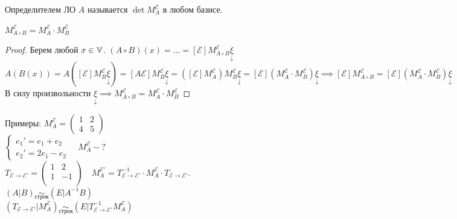 \documentclass[../main.tex]{subfiles}
\begin{document}
\begin{definition}
    Определителем ЛО $A$ называется $\det{M_{A}^{\mathcal{E}}}$ в любом базисе.
 \end{definition}

\begin{theorem}
    $M_{A\circ B }^{\mathcal{E}}=M_{A}^{\mathcal{E}}\cdot M_{B}^{\mathcal{E}}$
\end{theorem}
\begin{proof}
    Берем любой $x \in \mathbb{V}$. $(A\circ B )(x) = \dots = [\mathcal{E}]M_{A\circ B}^{\mathcal{E}}\underset{\downarrow}{\xi}$
    \\$A(B(x)) = A([\mathcal{E}]M_{B}^{\mathcal{E}}\underset{\downarrow}{\xi}) = [A\mathcal{E}]M_{B}^{\mathcal{E}}\underset{\downarrow}{\xi}= ([\mathcal{E}]M_{A}^{\mathcal{E}})M_{B}^{\mathcal{E}}\underset{\downarrow}{\xi}= [\mathcal{E}](M_{A}^{\mathcal{E}}\cdot M_{B}^{\mathcal{E}})\underset{\downarrow}{\xi}\implies [\mathcal{E}]M_{A\circ B}^{\mathcal{E}}= [\mathcal{E}](M_{A}^{\mathcal{E}} \cdot M_{B}^{\mathcal{E}})\underset{\downarrow}{\xi}$ \\В силу произвольности $\underset{\downarrow}{\xi}\implies M_{A\circ B}^{\mathcal{E}}= M_{A}^{\mathcal{E}}\cdot M_{B}^{\mathcal{E}}$
\end{proof}
Примеры: $M_{A}^{\mathcal{E}}= \begin{pmatrix}
    1 & 2 \\ 
    4 & 5
\end{pmatrix}$
\\\noindent $\begin{cases}
    e_{1}' = e_{1} + e_{2} \\
    e_{2}' = 2e_{1} - e_{2}
\end{cases} \quad M_{A}^{\mathcal{E}} - ?$
\\$T_{\mathcal{E}\to\mathcal{E'}}= \begin{pmatrix}
    1 & 2 \\
    1 & -1 \\
\end{pmatrix}\quad M_{A}^{\mathcal{E'}}= T^{-1}_{\mathcal{E}\to\mathcal{E'}}\cdot M_{A}^{\mathcal{E}}\cdot T_{\mathcal{E}\to\mathcal{E'}}$. 
\\$(A|B)\underset{\text{строк}}{\sim} (E|A^{-1}B)$
\\ $(T_{\mathcal{E}\to\mathcal{E'}}|M_{A}^{\mathcal{E}})\underset{\text{строк}}{\sim} (E | T^{-1}_{\mathcal{E}\to \mathcal{E'}}M_{A}^{\mathcal{E}})$
\end{document}
